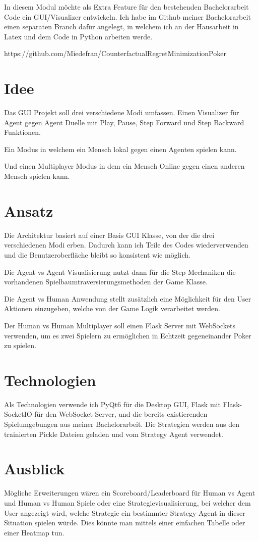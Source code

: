 \documentclass[12pt,german,english]{article}
\begin{document}
In diesem Modul möchte als Extra Feature für den bestehenden Bachelorarbeit Code ein GUI/Visualizer entwickeln.
Ich habe im Github meiner Bachelorarbeit einen separaten Branch dafür angelegt, in welchem ich an der Hausarbeit in Latex und dem Code in Python arbeiten werde.


https://github.com/Miedefran/CounterfactualRegretMinimizationPoker


\section{Idee}
Das GUI Projekt soll drei verschiedene Modi umfassen. Einen Visualizer für Agent gegen Agent Duelle mit Play, Pause, Step Forward und Step Backward Funktionen.


Ein Modus in welchem ein Mensch lokal gegen einen Agenten spielen kann. 


Und einen Multiplayer Modus in dem ein Mensch Online gegen einen anderen Mensch spielen kann.


\section{Ansatz}
Die Architektur basiert auf einer Basis GUI Klasse, von der die drei verschiedenen Modi erben. Dadurch kann ich Teile des Codes wiederverwenden und die Benutzeroberfläche bleibt so konsistent wie möglich.


Die Agent vs Agent Visualisierung nutzt dann für die Step Mechaniken die vorhandenen Spielbaumtraversierungsmethoden der Game Klasse.


Die Agent vs Human Anwendung stellt zusätzlich eine Möglichkeit für den User Aktionen einzugeben, welche von der Game Logik verarbeitet werden.


Der Human vs Human Multiplayer soll einen Flask Server mit WebSockets verwenden, um es zwei Spielern zu ermöglichen in Echtzeit gegeneinander Poker zu spielen.


\section{Technologien}
Als Technologien verwende ich PyQt6 für die Desktop GUI, Flask mit Flask-SocketIO für den WebSocket Server, und die bereits existierenden Spielumgebungen aus meiner Bachelorarbeit.
Die Strategien werden aus den trainierten Pickle Dateien geladen und vom Strategy Agent verwendet.


\section{Ausblick}
Mögliche Erweiterungen wären ein Scoreboard/Leaderboard für Human vs Agent und Human vs Human Spiele oder eine Strategievisualisierung, bei welcher dem User angezeigt wird, welche Strategie ein bestimmter Strategy Agent in dieser Situation spielen würde. Dies könnte man mittels einer einfachen Tabelle oder einer Heatmap tun.
\end{document}
